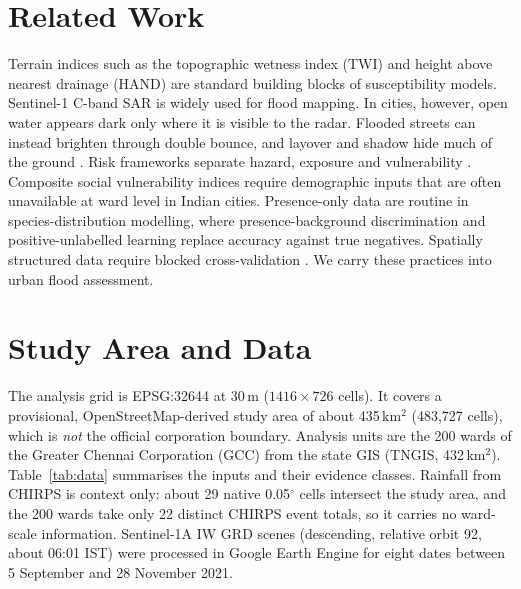 \documentclass[conference]{IEEEtran}
\begin{document}
\section{Related Work}
Terrain indices such as the topographic wetness index (TWI) \cite{beven1979twi} and height above nearest drainage (HAND) \cite{nobre2011hand} are standard building blocks of susceptibility models. Sentinel-1 C-band SAR \cite{torres2012s1} is widely used for flood mapping. In cities, however, open water appears dark only where it is visible to the radar. Flooded streets can instead brighten through double bounce, and layover and shadow hide much of the ground \cite{mason2018urban,chini2019coherence,zhao2024review}. Risk frameworks separate hazard, exposure and vulnerability \cite{ipcc2012srex}. Composite social vulnerability indices \cite{cutter2003sovi} require demographic inputs that are often unavailable at ward level in Indian cities. Presence-only data are routine in species-distribution modelling, where presence-background discrimination \cite{phillips2006maxent} and positive-unlabelled learning \cite{elkan2008pu} replace accuracy against true negatives. Spatially structured data require blocked cross-validation \cite{roberts2017cv,valavi2019blockcv}. We carry these practices into urban flood assessment.

\section{Study Area and Data}
The analysis grid is EPSG:32644 at 30\,m ($1416\times726$ cells). It covers a provisional, OpenStreetMap-derived study area of about 435\,km$^2$ (483{,}727 cells), which is \emph{not} the official corporation boundary. Analysis units are the 200 wards of the Greater Chennai Corporation (GCC) from the state GIS (TNGIS, 432\,km$^2$). Table~\ref{tab:data} summarises the inputs and their evidence classes. Rainfall from CHIRPS \cite{funk2015chirps} is context only: about 29 native 0.05$^\circ$ cells intersect the study area, and the 200 wards take only 22 distinct CHIRPS event totals, so it carries no ward-scale information. Sentinel-1A IW GRD scenes (descending, relative orbit 92, about 06:01 IST) were processed in Google Earth Engine \cite{gorelick2017gee} for eight dates between 5 September and 28 November 2021.
\end{document}
